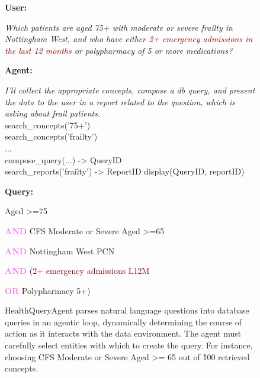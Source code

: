 \documentclass[11pt]{article}
\begin{document}
\begin{figure}[h!]

\textbf{User:}

{\leftskip 0.6cm

\textit{Which patients are \textcolor{Cerulean}{aged 75+} with \textcolor{Rhodamine}{moderate or severe frailty} in \textcolor{OliveGreen}{Nottingham West}, and who have either \textcolor{Maroon}{2+ emergency admissions in the last 12 months} or \textcolor{PineGreen}{polypharmacy of 5 or more medications?}} \\

}

\textbf{Agent:}

{\leftskip 0.6cm

	\textit{I'll collect the appropriate concepts, compose a db query, and present the data to the user in a report related to the question, which is asking about frail patients.} \\

	\ttfamily
	search\_concepts('75+') \\
	search\_concepts('frailty') \\
	... \\ %
	compose\_query(...) -> QueryID \\
	search\_reports('frailty') -> ReportID
	display(QueryID, reportID) \\
\par
}

\textbf{Query:}

{\leftskip 0.6cm

	\textcolor{Cerulean}{Aged >=75}

	\textbf{\textcolor{Violet}{AND}} \textcolor{Rhodamine}{CFS Moderate or Severe Aged >=65}
	
	\textbf{\textcolor{Violet}{AND}} \textcolor{OliveGreen}{Nottingham West PCN}
	
	\textbf{\textcolor{Violet}{AND}}  (\textcolor{Maroon}{2+ emergency admissions L12M}
	
	\hspace{2cm}	\textbf{\textcolor{Violet}{OR}}  \textcolor{PineGreen}{Polypharmacy 5+})
}
\caption{
	HealthQueryAgent parses natural language questions into database queries in an agentic loop, dynamically determining the course of action as it interacts with the data environment.
	The agent must carefully select entities with which to create the query. For instance, choosing \textcolor{Rhodamine}{CFS Moderate or Severe Aged >= 65} out of \~100 %
	retrieved concepts.
}
\label{fig:question-to-query}
\end{figure}
\end{document}

